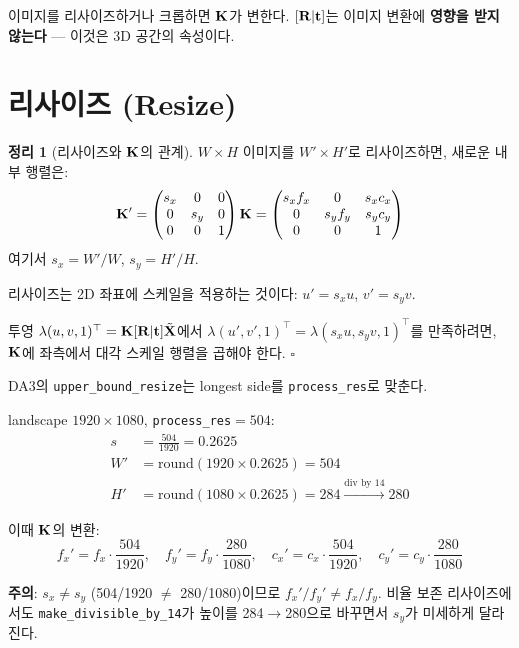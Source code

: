 \documentclass[11pt, a4paper]{report}
\theoremstyle{definition}
\newtheorem{theorem}{정리}[chapter]
\theoremstyle{remark}
\begin{document}
\begin{keyidea}
이미지를 리사이즈하거나 크롭하면 $\mathbf{K}$가 변한다.
$[\mathbf{R} | \mathbf{t}]$는 이미지 변환에 \textbf{영향을 받지 않는다} --- 이것은 3D 공간의 속성이다.
\end{keyidea}

\section{리사이즈 (Resize)}

\begin{theorem}[리사이즈와 $\mathbf{K}$의 관계]
\label{thm:resize}
$W \times H$ 이미지를 $W' \times H'$로 리사이즈하면, 새로운 내부 행렬은:
\begin{equation}
\mathbf{K}' = \begin{pmatrix} s_x & 0 & 0 \\ 0 & s_y & 0 \\ 0 & 0 & 1 \end{pmatrix} \mathbf{K}
= \begin{pmatrix} s_x f_x & 0 & s_x c_x \\ 0 & s_y f_y & s_y c_y \\ 0 & 0 & 1 \end{pmatrix}
\label{eq:resize_K}
\end{equation}
여기서 $s_x = W'/W$, $s_y = H'/H$.
\end{theorem}

\begin{proofbox}
리사이즈는 2D 좌표에 스케일을 적용하는 것이다:
$u' = s_x u$, $v' = s_y v$.

투영 $\lambda (u, v, 1)^\top = \mathbf{K}[\mathbf{R}|\mathbf{t}]\tilde{\mathbf{X}}$에서
$\lambda (u', v', 1)^\top = \lambda (s_x u, s_y v, 1)^\top$를 만족하려면,
$\mathbf{K}$에 좌측에서 대각 스케일 행렬을 곱해야 한다. $\square$
\end{proofbox}

\begin{practicebox}[title={실전: DA3의 리사이즈}]
DA3의 \texttt{upper\_bound\_resize}는 longest side를 \texttt{process\_res}로 맞춘다.

landscape $1920 \times 1080$, \texttt{process\_res}$= 504$:
\begin{align}
s &= \frac{504}{1920} = 0.2625 \\
W' &= \text{round}(1920 \times 0.2625) = 504 \\
H' &= \text{round}(1080 \times 0.2625) = 284 \xrightarrow{\text{div by 14}} 280
\end{align}

이때 $\mathbf{K}$의 변환:
\begin{equation}
f_x' = f_x \cdot \frac{504}{1920}, \quad
f_y' = f_y \cdot \frac{280}{1080}, \quad
c_x' = c_x \cdot \frac{504}{1920}, \quad
c_y' = c_y \cdot \frac{280}{1080}
\end{equation}

\textbf{주의}: $s_x \neq s_y$ (504/1920 $\neq$ 280/1080)이므로 $f_x' / f_y' \neq f_x / f_y$.
비율 보존 리사이즈에서도 \texttt{make\_divisible\_by\_14}가 높이를 284$\rightarrow$280으로 바꾸면서
$s_y$가 미세하게 달라진다.
\end{practicebox}
\end{document}

